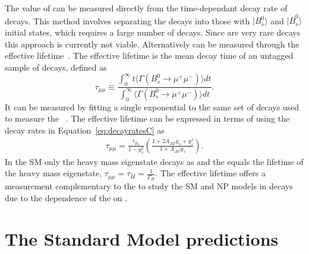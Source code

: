 The value of \ADG can be measured directly from the time-dependant decay rate of \bsmumu decays. This method involves separating the \bsmumu decays into those with $| B^0_s \rangle$ and $|\overline{B}^0_s\rangle$ initial states, which requires a large number of \bsmumu decays. Since \bsmumu are very rare decays this approach is currently not viable. Alternatively \ADG can be measured through the \bsmumu effective lifetime~\cite{DeBruyn:2012wj}. The effective lifetime is the mean decay time of an untagged sample of \bsmumu decays, defined as~\cite{Fleischer:2011cw}
\begin{equation}
  \tau_{\mu\mu} \equiv \frac{\int^{\infty}_0 t \langle \Gamma (B^0_s \to \mu^+ \mu^-) \rangle dt}{\int^{\infty}_0 \langle \Gamma (B^0_s \to\mu^+ \mu^-) \rangle dt}.
\label{eq:EL_def}
\end{equation}
It can be measured by fitting a single exponential to the same set of decays used to measure the \BF~\cite{DeBruyn:2012wj}. The effective lifetime can be expressed in terms of \ADG using the decay rates in Equation~\ref{eq:decayratesC} as
\begin{align}
\tau_{\mu\mu} %
= \frac{\tau_{B_{s}}}{1 - y_{s}^{2}} \left ( \frac{ 1 + 2A_{\Delta\Gamma}y_{s} + y_{s}^{2}}{1 + A_{\Delta\Gamma}y_{s}} \right).
\label{eq:lifetimedef}
\end{align}
In the SM only the heavy \bs mass eigenstate decays as \bsmumu and the \el equals the lifetime of the heavy mass eigenstate, $\tau_{\mu\mu} = \tau_H = \frac{1}{\Gamma_H}$. The effective lifetime offers a measurement complementary to the \BFs to study the SM and NP models in \bsmumu decays due to the dependence of the \el on \ADG.

\section{The Standard Model predictions}
\label{sec:SM_predictions}

